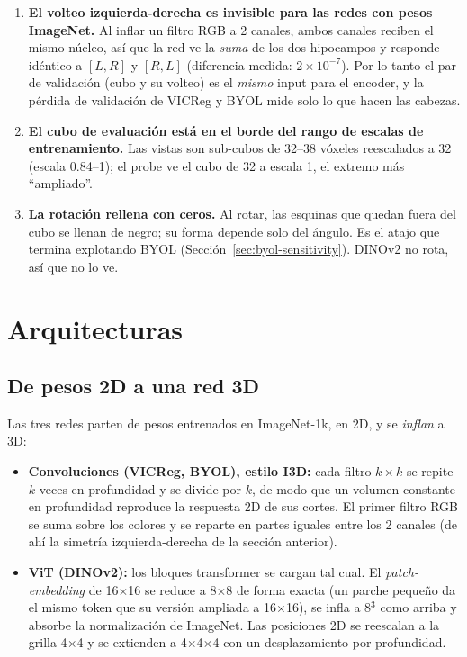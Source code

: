 \documentclass[11pt,a4paper]{article}
\begin{document}
\begin{warnbox}
\begin{enumerate}[leftmargin=14pt]
\item \textbf{El volteo izquierda-derecha es invisible para las redes con pesos ImageNet.}
  Al inflar un filtro RGB a 2 canales, ambos canales reciben el mismo núcleo, así que la
  red ve la \emph{suma} de los dos hipocampos y responde idéntico a $[L,R]$ y $[R,L]$
  (diferencia medida: $2\times10^{-7}$). Por lo tanto el par de validación (cubo y su
  volteo) es el \emph{mismo} input para el encoder, y la pérdida de validación de VICReg y
  BYOL mide solo lo que hacen las cabezas.
\item \textbf{El cubo de evaluación está en el borde del rango de escalas de
  entrenamiento.} Las vistas son sub-cubos de 32--38 vóxeles reescalados a 32 (escala
  0.84--1); el probe ve el cubo de 32 a escala 1, el extremo más ``ampliado''.
\item \textbf{La rotación rellena con ceros.} Al rotar, las esquinas que quedan fuera del cubo
  se llenan de negro; su forma depende solo del ángulo. Es el atajo que termina explotando BYOL
  (Sección~\ref{sec:byol-sensitivity}). DINOv2 no rota, así que no lo ve.
\end{enumerate}
\end{warnbox}

\section{Arquitecturas}
\label{sec:arch}

\subsection{De pesos 2D a una red 3D}

Las tres redes parten de pesos entrenados en ImageNet-1k, en 2D, y se \emph{inflan} a 3D:

\begin{itemize}
\item \textbf{Convoluciones (VICReg, BYOL), estilo I3D:} cada filtro $k\times k$ se
  repite $k$ veces en profundidad y se divide por $k$, de modo que un volumen constante en
  profundidad reproduce la respuesta 2D de sus cortes. El primer filtro RGB se suma
  sobre los colores y se reparte en partes iguales entre los 2 canales (de ahí la
  simetría izquierda-derecha de la sección anterior).
\item \textbf{ViT (DINOv2):} los bloques transformer se cargan tal cual. El
  \emph{patch-embedding} de 16$\times$16 se reduce a 8$\times$8 de forma exacta (un parche
  pequeño da el mismo token que su versión ampliada a 16$\times$16), se infla a 8$^3$ como
  arriba y absorbe la normalización de ImageNet. Las posiciones 2D se reescalan a la
  grilla 4$\times$4 y se extienden a 4$\times$4$\times$4 con un desplazamiento por
  profundidad.
\end{itemize}
\end{document}
